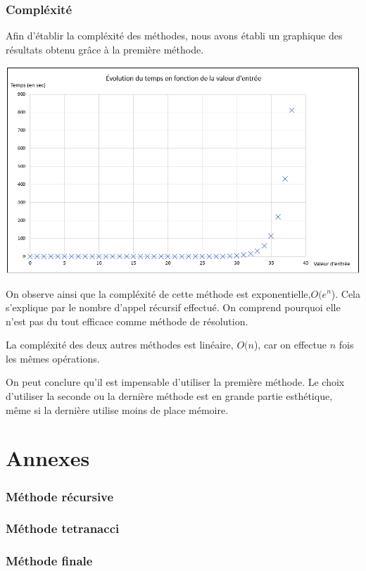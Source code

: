 \documentclass{article}
\newcommand{\code}[1]{}
\begin{document}
\section{Compléxité}

Afin d'établir la compléxité des méthodes, nous avons établi un graphique des résultats obtenu grâce à la première méthode.

\bigbreak
\begin{center}
\includegraphics[scale = 0.5]{Images/graphique.png}
\end{center}
\bigbreak

On observe ainsi que la compléxité de cette méthode est exponentielle,$ O(e^n$). Cela s'explique par le nombre d'appel récursif effectué. On comprend pourquoi elle n'est pas du tout efficace comme méthode de résolution.

La compléxité des deux autres méthodes est linéaire, $O(n$), car on effectue $n$ fois les mêmes opérations.

On peut conclure qu'il est impensable d'utiliser la première méthode. Le choix d'utiliser la seconde ou la dernière méthode est en grande partie esthétique, même si la dernière utilise moins de place mémoire.

\newpage
\part{Annexes}
\section*{Méthode récursive}
\code{Algos/Problem117_1_rapport.py}


\section*{Méthode tetranacci}
\code{Algos/Problem117_2_rapport.py}

\newpage
\section*{Méthode finale}
\code{Algos/Problem117_3_rapport.py}
\end{document}

